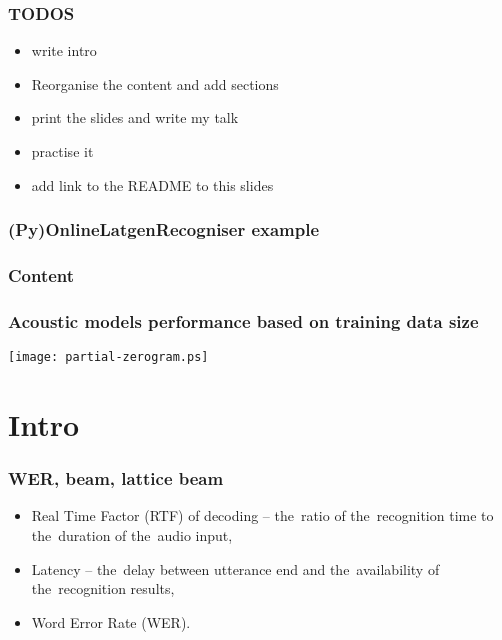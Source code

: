 

\maketitle


\begin{frame}\frametitle{TODOS} 
    \begin{itemize}
        \item write intro
        \item Reorganise the content and add sections
        \item print the slides and write my talk
        \item practise it
        \item add link to the README to this slides
    \end{itemize}
\end{frame}


\begin{frame}\frametitle{(Py)OnlineLatgenRecogniser example} 
    
\end{frame}


\begin{frame} \frametitle{Content} \tableofcontents \end{frame}

\begin{frame}\frametitle{Acoustic models performance based on training data size} 
    \texttt{[image: partial-zerogram.ps]}
\end{frame}

\section{Intro} 

\begin{frame}\frametitle{WER, beam, lattice beam} 
    \begin{itemize}
        \item Real Time Factor (RTF) of decoding -- the~ratio of the~recognition time to the~duration of the~audio input,
        \item Latency -- the~delay between utterance end and the~availability of the~recognition results,
        \item Word Error Rate (WER).
    \end{itemize}
\end{frame}


